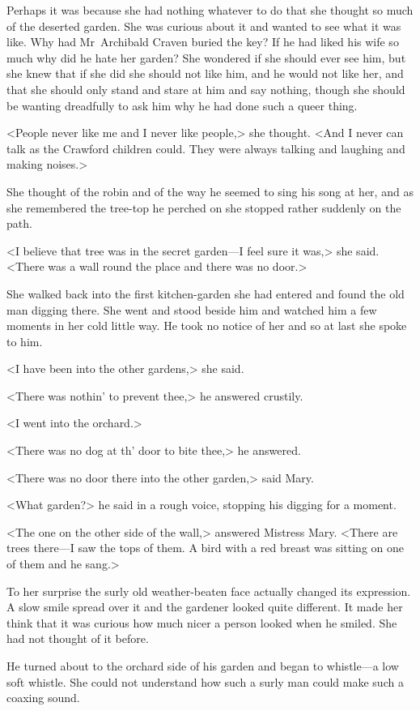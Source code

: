 Perhaps it was because she had nothing whatever to do that she thought so much of the deserted garden. She was curious about it and wanted to see what it was like. Why had Mr~Archibald Craven buried the key? If he had liked his wife so much why did he hate her garden? She wondered if she should ever see him, but she knew that if she did she should not like him, and he would not like her, and that she should only stand and stare at him and say nothing, though she should be wanting dreadfully to ask him why he had done such a queer thing.

<People never like me and I never like people,> she thought. <And I never can talk as the Crawford children could. They were always talking and laughing and making noises.>

She thought of the robin and of the way he seemed to sing his song at her, and as she remembered the tree-top he perched on she stopped rather suddenly on the path.

<I believe that tree was in the secret garden—I feel sure it was,> she said. <There was a wall round the place and there was no door.>

She walked back into the first kitchen-garden she had entered and found the old man digging there. She went and stood beside him and watched him a few moments in her cold little way. He took no notice of her and so at last she spoke to him.

<I have been into the other gardens,> she said.

<There was nothin' to prevent thee,> he answered crustily.

<I went into the orchard.>

<There was no dog at th' door to bite thee,> he answered.

<There was no door there into the other garden,> said Mary.

<What garden?> he said in a rough voice, stopping his digging for a moment.

<The one on the other side of the wall,> answered Mistress Mary. <There are trees there—I saw the tops of them. A bird with a red breast was sitting on one of them and he sang.>

To her surprise the surly old weather-beaten face actually changed its expression. A slow smile spread over it and the gardener looked quite different. It made her think that it was curious how much nicer a person looked when he smiled. She had not thought of it before.

He turned about to the orchard side of his garden and began to whistle—a low soft whistle. She could not understand how such a surly man could make such a coaxing sound.

